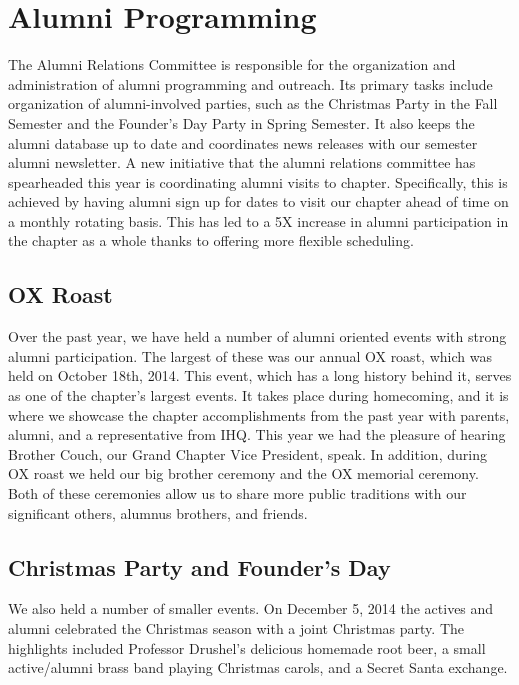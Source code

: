 \chapter{Alumni Programming}

  The Alumni Relations Committee is responsible for the organization and administration of alumni programming and outreach. Its primary tasks include organization of alumni-involved parties, such as the Christmas Party in the Fall Semester and the Founder's Day Party in Spring Semester. It also keeps the alumni database up to date and coordinates news releases with our semester alumni newsletter. A new initiative that the alumni relations committee has spearheaded this year is coordinating alumni visits to chapter. Specifically, this is achieved by having alumni sign up for dates to visit our chapter ahead of time on a monthly rotating basis. This has led to a 5X increase in alumni participation in the chapter as a whole thanks to offering more flexible scheduling.

  \section*{OX Roast}
    Over the past year, we have held a number of alumni oriented events with strong alumni participation. The largest of these was our annual OX roast, which was held on October 18th, 2014. This event, which has a long history behind it, serves as one of the chapter’s largest events. It takes place during homecoming, and it is where we showcase the chapter accomplishments from the past year with parents, alumni, and a representative from IHQ. This year we had the pleasure of hearing Brother Couch, our Grand Chapter Vice President, speak. In addition, during OX roast we held our big brother ceremony and the OX memorial ceremony. Both of these ceremonies allow us to share more public traditions with our significant others, alumnus brothers, and friends.
    
  \section*{Christmas Party and Founder's Day}
    We also held a number of smaller events. On December 5, 2014 the actives and alumni celebrated the Christmas season with a joint Christmas party. The highlights included Professor Drushel’s delicious homemade root beer, a small active/alumni brass band playing Christmas carols, and a Secret Santa exchange. \\
    
